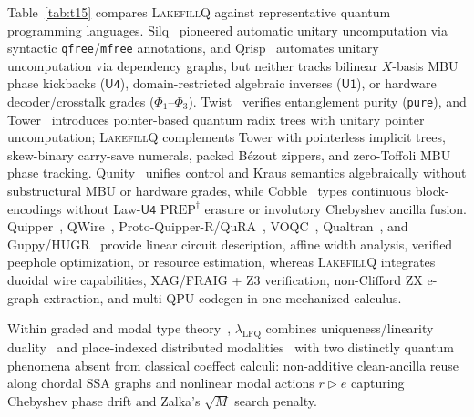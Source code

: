 \documentclass[acmsmall,screen,anonymous]{acmart}
\DeclareRobustCommand{\_}{\ifmmode\text{\char95}\else\char95\penalty0\relax\fi}
\theoremstyle{plain}
\newcommand{\LakefillQ}{\textsc{LakefillQ}}
\begin{document}
Table~\ref{tab:t15} compares \LakefillQ{} against representative quantum programming languages. Silq~\cite{bichsel2020} pioneered automatic unitary uncomputation via syntactic \texttt{qfree}/\texttt{mfree} annotations, and Qrisp~\cite{seidel2024} automates unitary uncomputation via dependency graphs, but neither tracks bilinear $X$-basis MBU phase kickbacks ($\mathsf{U4}$), domain-restricted algebraic inverses ($\mathsf{U1}$), or hardware decoder/crosstalk grades ($\Phi_1$--$\Phi_3$). Twist~\cite{yuan2022twist} verifies entanglement purity (\texttt{pure}), and Tower~\cite{yuan2022tower} introduces pointer-based quantum radix trees with unitary pointer uncomputation; \LakefillQ{} complements Tower with pointerless implicit trees, skew-binary carry-save numerals, packed B\'{e}zout zippers, and zero-Toffoli MBU phase tracking. Qunity~\cite{voichick2023} unifies control and Kraus semantics algebraically without substructural MBU or hardware grades, while Cobble~\cite{cobble2026} types continuous block-encodings without Law-$\mathsf{U4}$ $\mathrm{PREP}^\dagger$ erasure or involutory Chebyshev ancilla fusion. Quipper~\cite{green2013}, QWire~\cite{paykin2017}, Proto-Quipper-R/QuRA~\cite{colledan2024,colledan2025protoquipperr,sakayori2025protoquipperc}, VOQC~\cite{hietala2021}, Qualtran~\cite{harrigan2024}, and Guppy/HUGR~\cite{koch2025} provide linear circuit description, affine width analysis, verified peephole optimization, or resource estimation, whereas \LakefillQ{} integrates duoidal wire capabilities, XAG/FRAIG + Z3 verification, non-Clifford ZX e-graph extraction, and multi-QPU codegen in one mechanized calculus.

Within graded and modal type theory~\cite{atkey2018,orchard2019granule,katsumata2014parametric,orchard2020unifying,gaboardi2016combining,abel2020unified,choudhury2021grad,moon2021grtt,wood2022substructural,abel2023graded}, $\lambda_{\mathrm{LFQ}}$ combines uniqueness/linearity duality~\cite{marshall2022entente} and place-indexed distributed modalities~\cite{murphy2008ml5} with two distinctly quantum phenomena absent from classical coeffect calculi: non-additive clean-ancilla reuse along chordal SSA graphs and nonlinear modal actions $r \triangleright e$ capturing Chebyshev phase drift and Zalka's $\sqrt{M}$ search penalty.
\end{document}
